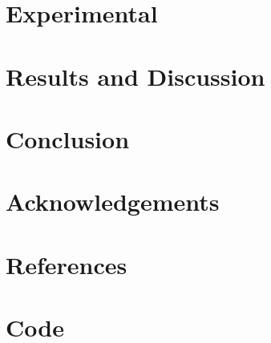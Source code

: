 \documentclass{report}
\begin{document}
  \chapter{Experimental}
  

  \chapter{Results and Discussion}
  


  \chapter{Conclusion}

  \chapter*{Acknowledgements}

  \chapter*{References}


  \appendix
  \chapter{Code}
\end{document}
